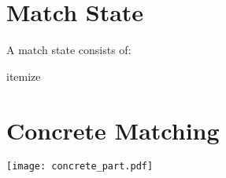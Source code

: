 \documentclass{article}
\begin{document}
\section{Match State}

A match state consists of:

itemize

\section{Concrete Matching}



\begin{center}
    \texttt{[image: concrete\_part.pdf]}
\end{center}
\end{document}
